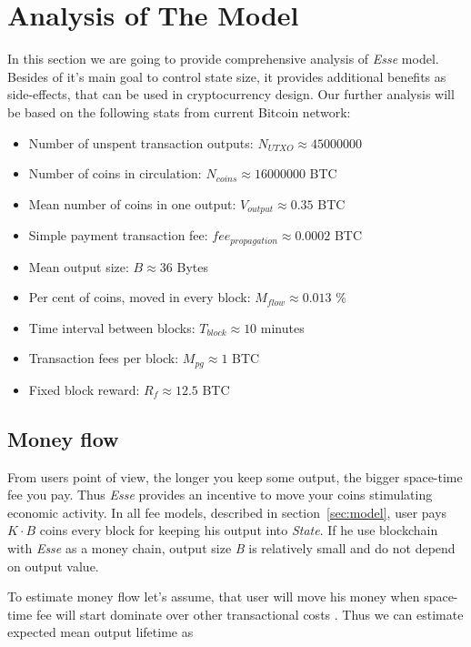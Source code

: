 \documentclass[]{article}   %
\newcommand{\authnote}[2]{\marginpar{\parbox{\marginparwidth}{\tiny %
  \textsf{#1 {\textcolor{blue}{notes: #2}}}}}%
  \textcolor{blue}{\textbf{\dag}}}
\newcommand{\authnote}[2]{
  \textsf{#1 \textcolor{blue}{: #2}}}
\newcommand{\authnote}[2]{}
\newcommand{\dnote}[1]{{\authnote{\textcolor{blue}{Dima notes}}{#1}}}
\newcommand{\esse}{\textit{Esse}}
\newcommand{\state}{\textit{State}}
\begin{document}
\section{Analysis of The Model}
\label{sec:analysis}

In this section we are going to provide comprehensive analysis of \esse{} model. Besides of it's main goal to control state size, it provides additional benefits as side-effects, that can be used in cryptocurrency design. Our further analysis will be based on the following stats from current Bitcoin network:

\begin{itemize}
  \item Number of unspent transaction outputs: $N_{UTXO} \approx 45000000$
  \item Number of coins in circulation: $N_{coins} \approx 16000000$ BTC
  \item Mean number of coins in one output: $V_{output} \approx 0.35$ BTC
  \item Simple payment transaction fee: $fee_{propagation} \approx 0.0002$ BTC
  \item Mean output size: $B \approx 36$ Bytes
  \item Per cent of coins, moved in every block: $M_{flow} \approx 0.013$ \%
  \item Time interval between blocks: $T_{block} \approx 10$ minutes
  \item Transaction fees per block: $M_{pg} \approx 1$ BTC
  \item Fixed block reward: $R_{f} \approx 12.5$ BTC
\end{itemize}

\subsection{Money flow}
\label{sec:flow}

From users point of view, the longer you keep some output, the bigger space-time fee you pay. Thus \esse{} provides an incentive to move your coins stimulating economic activity. In all fee models, described in section~\ref{sec:model}, user pays ${K \cdot B}$ coins every block for keeping his output into \state{}. If he use blockchain with \esse{} as a money chain, output size \textit{B} is relatively small and do not depend on output value.

To estimate money flow let's assume, that user will move his money when space-time fee will start dominate over other transactional costs \dnote{why?}. Thus we can estimate expected mean output lifetime as
\end{document}
